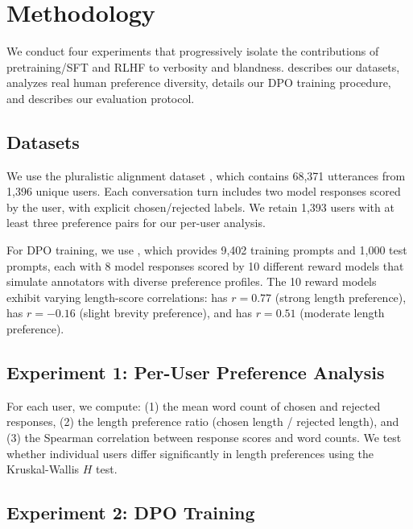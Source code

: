 \section{Methodology}
\label{sec:method}

We conduct four experiments that progressively isolate the contributions of pretraining/SFT and RLHF to verbosity and blandness.  describes our datasets,  analyzes real human preference diversity,  details our DPO training procedure, and  describes our evaluation protocol.

\subsection{Datasets}
\label{sec:data}

 We use the \prism pluralistic alignment dataset \citep{kirk2024prism}, which contains 68,371 utterances from 1,396 unique users. Each conversation turn includes two model responses scored by the user, with explicit chosen/rejected labels. We retain 1,393 users with at least three preference pairs for our per-user analysis.

 For DPO training, we use \personalllm \citep{personalllm2024}, which provides 9,402 training prompts and 1,000 test prompts, each with 8 model responses scored by 10 different reward models that simulate annotators with diverse preference profiles. The 10 reward models exhibit varying length-score correlations: \gemma has $r{=}0.77$ (strong length preference), \beaver has $r{=}-0.16$ (slight brevity preference), and \oasst has $r{=}0.51$ (moderate length preference).

\subsection{Experiment 1: Per-User Preference Analysis}
\label{sec:prism_analysis}

For each \prism user, we compute: (1) the mean word count of chosen and rejected responses, (2) the length preference ratio (chosen length / rejected length), and (3) the Spearman correlation between response scores and word counts. We test whether individual users differ significantly in length preferences using the Kruskal-Wallis $H$ test.

\subsection{Experiment 2: DPO Training}
\label{sec:dpo_training}

